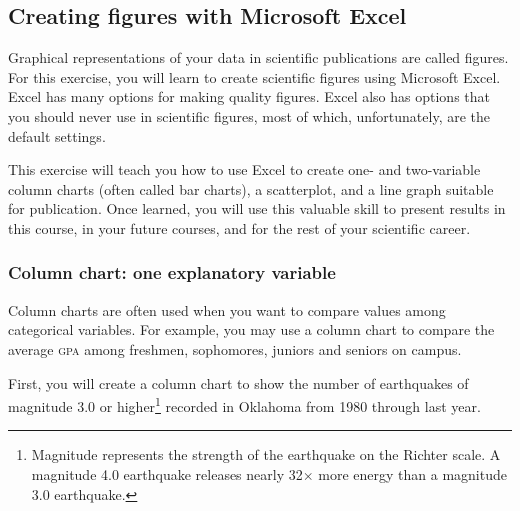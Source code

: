 \documentclass[12pt, hidelinks]{exam}
\begin{document}
\subsection*{Creating figures with Microsoft Excel\texttrademark}

Graphical representations of your data in scientific publications are called figures. For this exercise, you will learn to create scientific figures using Microsoft Excel. Excel has many options for making quality figures. Excel also has options that you should never use in scientific figures, most of which, unfortunately, are the default settings.  

This exercise will teach you how to use Excel to create one- and two-variable column charts (often called bar charts), a scatterplot, and a line graph suitable for publication. Once learned, you will use this valuable skill to present results in this course, in your future courses, and for the rest of your scientific career. 

\subsubsection*{Column chart: one explanatory variable}

Column charts are often used when you want to compare values among categorical variables. For example, you may use a column chart to compare the average \textsc{gpa} among freshmen, sophomores, juniors and seniors on campus. 

First, you will create a column chart to show the number of earthquakes of magnitude 3.0 or higher\footnote{Magnitude represents the strength of the earthquake on the Richter scale. A magnitude 4.0 earthquake releases nearly 32$\times$ more energy than a magnitude 3.0 earthquake.} recorded in Oklahoma from 1980 through last year. \bigskip
\end{document}
